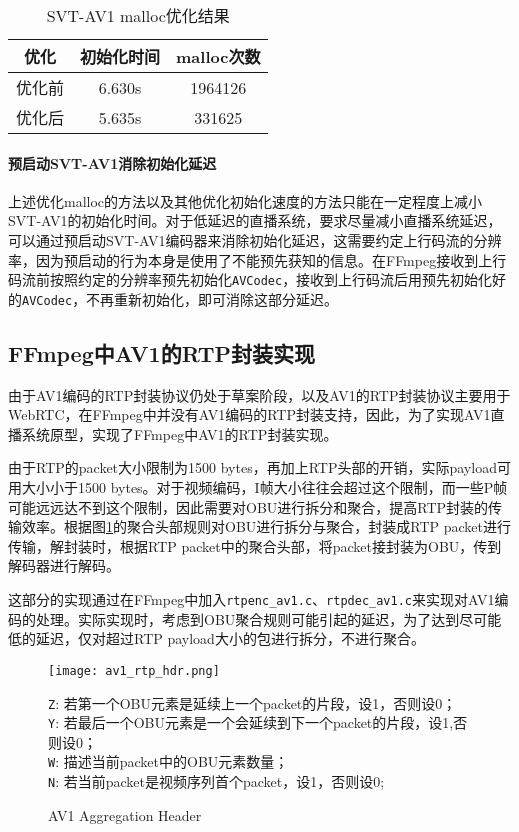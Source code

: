   \begin{table}[!hpt]
    \caption{SVT-AV1 malloc优化结果}
    \label{tab:malloc}
    \centering
    \begin{tabular}{ccc} \toprule
      优化    & 初始化时间 & malloc次数\\ \midrule
      优化前  & 6.630s   & 1964126  \\
      优化后  & 5.635s   & 331625   \\ \bottomrule
    \end{tabular}
  \end{table}

  \paragraph{预启动SVT-AV1消除初始化延迟} 上述优化malloc的方法以及其他优化初始化速度的方法只能在一定程度上减小SVT-AV1的初始化时间。对于低延迟的直播系统，要求尽量减小直播系统延迟，可以通过预启动SVT-AV1编码器来消除初始化延迟，这需要约定上行码流的分辨率，因为预启动的行为本身是使用了不能预先获知的信息。在FFmpeg接收到上行码流前按照约定的分辨率预先初始化\texttt{AVCodec}，接收到上行码流后用预先初始化好的\texttt{AVCodec}，不再重新初始化，即可消除这部分延迟。

\subsection{FFmpeg中AV1的RTP封装实现}
  由于AV1编码的RTP封装协议仍处于草案阶段，以及AV1的RTP封装协议主要用于WebRTC，在FFmpeg中并没有AV1编码的RTP封装支持，因此，为了实现AV1直播系统原型，实现了FFmpeg中AV1的RTP封装实现。

  由于RTP的packet大小限制为1500 bytes，再加上RTP头部的开销，实际payload可用大小小于1500 bytes。对于视频编码，I帧大小往往会超过这个限制，而一些P帧可能远远达不到这个限制，因此需要对OBU进行拆分和聚合，提高RTP封装的传输效率。根据图\ref{fig:av1rtp-aggr}的聚合头部规则对OBU进行拆分与聚合，封装成RTP packet进行传输，解封装时，根据RTP packet中的聚合头部，将packet接封装为OBU，传到解码器进行解码。

  这部分的实现通过在FFmpeg中加入\texttt{rtpenc\_av1.c}、\texttt{rtpdec\_av1.c}来实现对AV1编码的处理。实际实现时，考虑到OBU聚合规则可能引起的延迟，为了达到尽可能低的延迟，仅对超过RTP payload大小的包进行拆分，不进行聚合。

  \begin{figure}[!htp]
    \centering
    \texttt{[image: av1\_rtp\_hdr.png]} \\
    \raggedright
      \texttt{Z}: 若第一个OBU元素是延续上一个packet的片段，设1，否则设0；\\
      \texttt{Y}: 若最后一个OBU元素是一个会延续到下一个packet的片段，设1,否则设0；\\
      \texttt{W}: 描述当前packet中的OBU元素数量；\\
      \texttt{N}: 若当前packet是视频序列首个packet，设1，否则设0;\\
    \caption{AV1 Aggregation Header}
   \label{fig:av1rtp-aggr}
  \end{figure}


